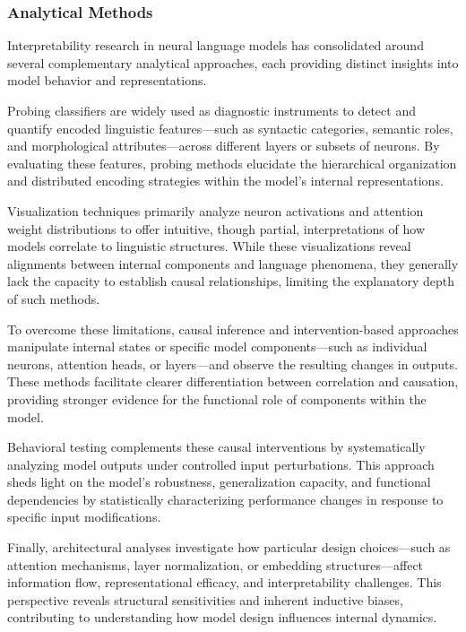 \documentclass[sigconf]{acmart}
\begin{document}
\subsubsection{Analytical Methods}

Interpretability research in neural language models has consolidated around several complementary analytical approaches, each providing distinct insights into model behavior and representations.

Probing classifiers are widely used as diagnostic instruments to detect and quantify encoded linguistic features—such as syntactic categories, semantic roles, and morphological attributes—across different layers or subsets of neurons. By evaluating these features, probing methods elucidate the hierarchical organization and distributed encoding strategies within the model’s internal representations.

Visualization techniques primarily analyze neuron activations and attention weight distributions to offer intuitive, though partial, interpretations of how models correlate to linguistic structures. While these visualizations reveal alignments between internal components and language phenomena, they generally lack the capacity to establish causal relationships, limiting the explanatory depth of such methods.

To overcome these limitations, causal inference and intervention-based approaches manipulate internal states or specific model components—such as individual neurons, attention heads, or layers—and observe the resulting changes in outputs. These methods facilitate clearer differentiation between correlation and causation, providing stronger evidence for the functional role of components within the model.

Behavioral testing complements these causal interventions by systematically analyzing model outputs under controlled input perturbations. This approach sheds light on the model’s robustness, generalization capacity, and functional dependencies by statistically characterizing performance changes in response to specific input modifications.

Finally, architectural analyses investigate how particular design choices—such as attention mechanisms, layer normalization, or embedding structures—affect information flow, representational efficacy, and interpretability challenges. This perspective reveals structural sensitivities and inherent inductive biases, contributing to understanding how model design influences internal dynamics.
\end{document}
